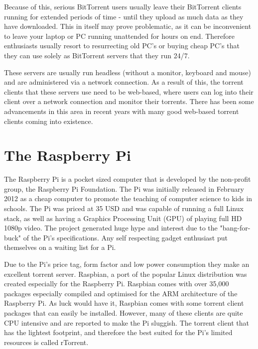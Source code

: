 Because of this, serious BitTorrent users usually leave their BitTorrent clients running for extended periods of time - until they upload as much data as they have downloaded. This in itself may prove problematic, as it can be inconvenient to leave your laptop or PC running unattended for hours on end. Therefore enthusiasts usually resort to resurrecting old PC's or buying cheap PC's that they can use solely as BitTorrent servers that they run 24/7.

These servers are usually run headless (without a monitor, keyboard and mouse) and are administered via a network connection. As a result of this, the torrent clients that these servers use need to be web-based, where users can log into their client over a network connection and monitor their torrents. There has been some advancements in this area in recent years with many good web-based torrent clients coming into existence.  


\section{The Raspberry Pi}
The Raspberry Pi\cite{RaspberryPi} is a pocket sized computer that is developed by the non-profit group, the Raspberry Pi Foundation. The Pi was initially released in February 2012 as a cheap computer to promote the teaching of computer science to kids in schools. The Pi was priced at 35 USD and was capable of running a full Linux stack, as well as having a Graphics Processing Unit (GPU) of playing full HD 1080p video. The project generated huge hype and interest due to the "bang-for-buck" of the Pi's specifications. Any self respecting gadget enthusiast put themselves on a waiting list for a Pi. 

Due to the Pi's price tag, form factor and low power consumption they make an excellent torrent server. Raspbian\cite{Raspbian}, a port of the popular Linux distribution was created especially for the Raspberry Pi. Raspbian comes with over 35,000 packages especially compiled and optimised for the ARM architecture of the Raspberry Pi. As luck would have it, Raspbian comes with some torrent client packages that can easily be installed. However, many of these clients are quite CPU intensive and are reported to make the Pi sluggish. The torrent client that has the lightest footprint, and therefore the best suited for the Pi's limited resources is called rTorrent. 

